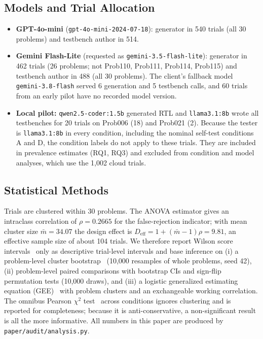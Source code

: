 \documentclass[conference]{IEEEtran}
\begin{document}
\subsection{Models and Trial Allocation}
\begin{itemize}
    \item \textbf{GPT-4o-mini} (\texttt{gpt-4o-mini-2024-07-18}): generator in 540 trials (all 30 problems) and testbench author in 514.
    \item \textbf{Gemini Flash-Lite} (requested as \texttt{gemini-3.5-flash-lite}): generator in 462 trials (26 problems; not Prob110, Prob111, Prob114, Prob115) and testbench author in 488 (all 30 problems). The client's fallback model \texttt{gemini-3.8-flash} served 6 generation and 5 testbench calls, and 60 trials from an early pilot have no recorded model version.
    \item \textbf{Local pilot:} \texttt{qwen2.5-coder:1.5b} generated RTL and \texttt{llama3.1:8b} wrote all testbenches for 20 trials on Prob006 (18) and Prob021 (2). Because the tester is \texttt{llama3.1:8b} in every condition, including the nominal self-test conditions A and D, the condition labels do not apply to these trials. They are included in prevalence estimates (RQ1, RQ3) and excluded from condition and model analyses, which use the 1,002 cloud trials.
\end{itemize}

\subsection{Statistical Methods}
Trials are clustered within 30 problems. The ANOVA estimator gives an intraclass correlation of $\rho = 0.2665$ for the false-rejection indicator; with mean cluster size $\bar{m} = 34.07$ the design effect is $D_{\text{eff}} = 1 + (\bar{m}-1)\rho = 9.81$, an effective sample size of about 104 trials. We therefore report Wilson score intervals~\cite{wilson1927probable} only as descriptive trial-level intervals and base inference on (i) a problem-level cluster bootstrap~\cite{cameron2015practitioner, efron1994introduction} (10,000 resamples of whole problems, seed 42), (ii) problem-level paired comparisons with bootstrap CIs and sign-flip permutation tests (10,000 draws), and (iii) a logistic generalized estimating equation (GEE)~\cite{liang1986longitudinal} with problem clusters and an exchangeable working correlation. The omnibus Pearson $\chi^2$ test~\cite{pearson1900criterion} across conditions ignores clustering and is reported for completeness; because it is anti-conservative, a non-significant result is all the more informative. All numbers in this paper are produced by \texttt{paper/audit/analysis.py}.
\end{document}
